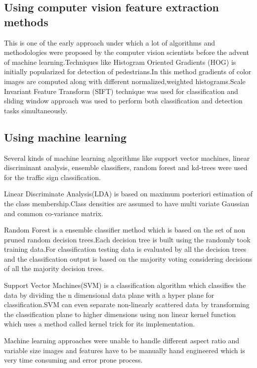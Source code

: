 \documentclass[letterpaper, 10 pt, conference]{ieeeconf}  %
\begin{document}
\subsection{Using computer vision feature extraction methods}
This is one of the early approach under which a lot of algorithms and methodologies were proposed by the computer vision scientists before the advent of machine learning.Techniques like Histogram Oriented Gradients (HOG)\cite{1467360} is initially popularized for detection of pedestrians.In this method gradients of color images are computed along with different normalized,weighted histograms.Scale Invariant Feature Transform (SIFT)\cite{Lowe:1999:ORL:850924.851523} technique was used for classification and sliding window approach was used to perform both classification and detection tasks simultaneously.

\subsection{Using machine learning}Several kinds of machine learning
algorithms\cite{park2013design} like support vector machines, linear discriminant analysis\cite{malik2007road}, ensemble classifiers, random forest and kd-trees\cite{zaklouta2014real} were used for the traffic sign classification.\par

Linear Discriminate Analysis(LDA)\cite{wu2013traffic} is based on maximum posteriori estimation of the class membership.Class densities are assumed to have multi variate Gaussian and common co-variance matrix.\par

Random Forest is a ensemble classifier method\cite{stallkamp2011german} which is based on the set of non pruned random decision trees.Each decision tree is built using the randomly took training data.For classification testing data is evaluated by all the decision trees and the classification output is based on the majority voting considering decisions of all the majority decision trees.\par

Support Vector Machines(SVM) is a classification algorithm which classifies the data by dividing the n dimensional data plane with a hyper plane for classification\cite{park2013design}.SVM can even separate non-linearly scattered data by transforming the classification plane to higher dimensions using non linear kernel function which uses a method called kernel trick for its implementation.\par
Machine learning approaches\cite{mogelmose2012vision} were unable to handle different aspect ratio and variable size images and features have to be manually hand engineered which is very time consuming and error prone process.
\end{document}
